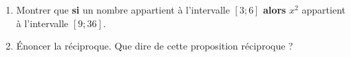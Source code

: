 
\begin{enumerate}
\item Montrer que \textbf{si} un nombre appartient à l'intervalle $[3;6]$ \textbf{alors} $x^2$ appartient à l'intervalle $[9;36]$. 
\item Énoncer la réciproque. Que dire de cette proposition réciproque ?
\end{enumerate}